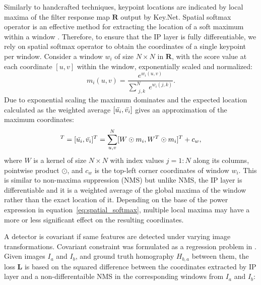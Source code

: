 Similarly to handcrafted techniques, keypoint locations are indicated by local maxima of the filter response map $\mathbf{R}$ output by Key.Net. Spatial softmax operator is an effective method for extracting the location of a soft maximum within a window \cite{LIFT, keypointnet_nips_18, OnoSerra18, detone2017superpoint}. Therefore, to ensure that the IP layer is fully differentiable, we rely on spatial softmax operator to obtain the coordinates of a single keypoint per window. Consider a window $w_i$ of size $N \times N$ in $\mathbf{R}$, with the score value at each coordinate $[u,v]$ within the window, exponentially scaled and normalized: 
\begin{equation}
m_{i}(u,v) = \dfrac{e^{w_i(u, v)}}{\sum_{\substack{j, k}}^{N} e^{w_i(j, k)}}.
\label{eq:spatial_softmax}
\end{equation}
Due to exponential scaling the maximum dominates and the expected location calculated as the weighted average $[\Bar{u_i},\Bar{v_i}]$ gives an approximation of the maximum coordinates:
\begin{equation}
[x_i,y_i]^{T}=[\Bar{u_i}, \Bar{v_i}]^{T} =\sum_{\substack{u, v}}^{N} [W \odot m_{i}, W^T \odot m_{i}]^{T} + c_{w},
\label{eq:Index_Proposal}
\end{equation}
where $W$ is a kernel of size $N \times N$ with index values $j=1:N$ along its columns, pointwise product $\odot$, and $c_{w}$ is the top-left corner coordinates of window $w_{i}$. This is similar to non-maxima suppression (NMS) but unlike NMS, the IP layer is differentiable and it is a weighted average of the global maxima of the window rather than the exact location of it. Depending on the base of the power expression in equation~\ref{eq:spatial_softmax}, multiple local maxima may have a more or less significant effect on the resulting coordinates.

A detector is covariant if same features are detected under varying image transformations. Covariant constraint was formulated as a regression problem in \cite{Karel_Vedaldi_ECCV_16}. Given images $I_{a}$ and $I_{b}$, and ground truth homography $H_{b,a}$ between them,  the loss $\mathbf{L}$ is based on the squared difference between the coordinates extracted by IP layer and a non-differentaible NMS in the corresponding windows from $I_{a}$ and $I_{b}$:

